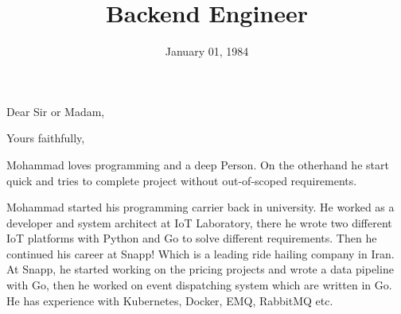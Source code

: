 \documentclass[11pt,a4paper,sans]{moderncv}
\title{Backend Engineer}
\begin{document}
\maketitle

\date{January 01, 1984}
\opening{Dear Sir or Madam,}
\closing{Yours faithfully,}
\makelettertitle

Mohammad loves programming and a deep Person. On the otherhand he start quick and tries to complete project without out-of-scoped requirements.

Mohammad started his programming carrier back in university.
He worked as a developer and system architect at IoT Laboratory, there he wrote two different IoT platforms with Python and Go to solve different requirements.
Then he continued his career at Snapp! Which is a leading ride hailing company in Iran. At Snapp,
he started working on the pricing projects and wrote a data pipeline with Go, then he worked on event dispatching system which are written in Go.
He has experience with Kubernetes, Docker, EMQ, RabbitMQ etc.

\makeletterclosing
\end{document}
